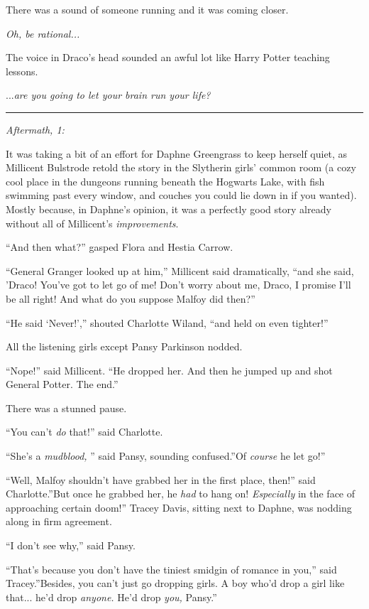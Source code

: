 There was a sound of someone running and it was coming closer.

\emph{Oh, be rational...}

The voice in Draco's head sounded an awful lot like Harry Potter
teaching lessons.

...\emph{are you going to let your brain run your life?}

\begin{center}\rule{3in}{0.4pt}\end{center}

\emph{Aftermath, 1:}

It was taking a bit of an effort for Daphne Greengrass to keep herself
quiet, as Millicent Bulstrode retold the story in the Slytherin girls'
common room (a cozy cool place in the dungeons running beneath the
Hogwarts Lake, with fish swimming past every window, and couches you
could lie down in if you wanted). Mostly because, in Daphne's opinion,
it was a perfectly good story already without all of Millicent's
\emph{improvements}.

``And then what?'' gasped Flora and Hestia Carrow.

``General Granger looked up at him,'' Millicent said dramatically, ``and
she said, 'Draco! You've got to let go of me! Don't worry about me,
Draco, I promise I'll be all right! And what do you suppose Malfoy did
then?''

``He said `Never!','' shouted Charlotte Wiland, ``and held on even
tighter!''

All the listening girls except Pansy Parkinson nodded.

``Nope!'' said Millicent. ``He dropped her. And then he jumped up and
shot General Potter. The end.''

There was a stunned pause.

``You can't \emph{do} that!'' said Charlotte.

``She's a \emph{mudblood,} '' said Pansy, sounding confused.''Of
\emph{course} he let go!''

``Well, Malfoy shouldn't have grabbed her in the first place, then!''
said Charlotte.''But once he grabbed her, he \emph{had} to hang on!
\emph{Especially} in the face of approaching certain doom!'' Tracey
Davis, sitting next to Daphne, was nodding along in firm agreement.

``I don't see why,'' said Pansy.

``That's because you don't have the tiniest smidgin of romance in you,''
said Tracey.''Besides, you can't just go dropping girls. A boy who'd
drop a girl like that... he'd drop \emph{anyone.} He'd drop
\emph{you,} Pansy.''

